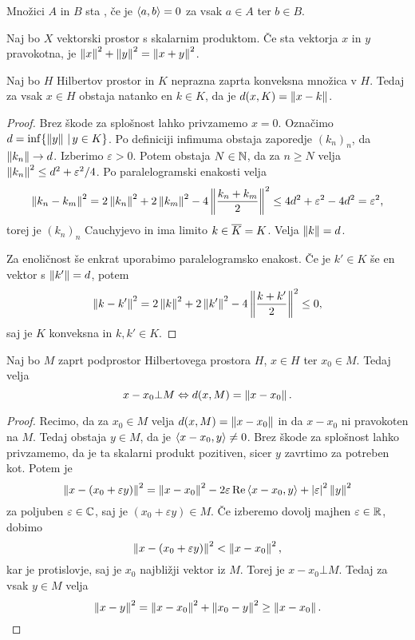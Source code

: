\begin{definicija}
  Množici $A$ in $B$ sta , če je $\left< a,b \right> = 0$ za vsak $a \in
  A$ ter $b \in B$.
\end{definicija}

\begin{izrek}[Pitagora]
  Naj bo $X$ vektorski prostor s skalarnim produktom.
  Če sta vektorja $x$ in $y$ pravokotna, je $\left\lVert x\right\rVert^2 + \left\lVert y\right\rVert^2 =
  \left\lVert x+y\right\rVert^2$.
\end{izrek}

\begin{izrek}
  Naj bo $H$ Hilbertov prostor in $K$ neprazna zaprta konveksna množica v $H$.
  Tedaj za vsak $x \in H$ obstaja natanko en $k \in K$, da je $d(x,K) =
  \left\lVert x-k\right\rVert$.
\end{izrek}

\begin{proof}
  Brez škode za splošnost lahko privzamemo $x = 0$.
  Označimo $d = \inf \{\left\lVert y\right\rVert \,|\, y \in K\}$.
  Po definiciji infimuma obstaja zaporedje $(k_n)_n$, da $\left\lVert k_n\right\rVert \to d$.
  Izberimo $\varepsilon > 0$.
  Potem obstaja $N \in \mathbb{N}$, da za $n \ge N$ velja $\left\lVert k_n\right\rVert^2 \le d^2 +
  \varepsilon^2 /4$.
  Po paralelogramski enakosti velja
  \[
	\left\lVert k_n - k_m\right\rVert^2 = 2 \left\lVert k_n\right\rVert^2 + 2 \left\lVert k_m\right\rVert^2 - 4 \left\lVert\frac{k_n +
		k_m}{2}\right\rVert^2
	\le 4 d^2 + \varepsilon^2 - 4 d^2 = \varepsilon^2,
  \]
  torej je $(k_n)_n$ Cauchyjevo in ima limito $k \in \overline{K} = K$.
  Velja $\left\lVert k\right\rVert = d$.

  Za enoličnost še enkrat uporabimo paralelogramsko enakost.
  Če je $k' \in K$ še en vektor s $\left\lVert k'\right\rVert = d$, potem
  \[
	\left\lVert k-k'\right\rVert^2 = 2 \left\lVert k\right\rVert^2 + 2 \left\lVert k'\right\rVert^2 - 4 \left\lVert\frac{k+k'}{2}\right\rVert^2 \le 0,
  \]
  saj je $K$ konveksna in $k, k' \in K$.
\end{proof}


\begin{izrek}
  Naj bo $M$ zaprt podprostor Hilbertovega prostora $H$, $x \in H$ ter $x_0 \in
  M$.
  Tedaj velja
  \[
	x - x_0 \bot M \Leftrightarrow d(x,M) = \left\lVert x-x_0\right\rVert.
  \]
\end{izrek}

\begin{proof}
  Recimo, da za $x_0 \in M$ velja $d(x,M) = \left\lVert x-x_0\right\rVert$ in da $x - x_0$ ni
  pravokoten na $M$.
  Tedaj obstaja $y \in M$, da je $\left< x - x_0, y \right> \ne 0$.
  Brez škode za splošnost lahko privzamemo, da je ta skalarni produkt pozitiven,
  sicer $y$ zavrtimo za potreben kot.
  Potem je
  \[
	\left\lVert x - (x_0 + \varepsilon y)\right\rVert^2 = \left\lVert x - x_0\right\rVert^2 -
	2 \varepsilon \operatorname{Re} \left< x - x_0, y \right> + \left| \varepsilon \right|^2 \left\lVert y\right\rVert^2
  \]
  za poljuben $\varepsilon \in \mathbb{C}$, saj je $(x_0 + \varepsilon y) \in M$.
  Če izberemo dovolj majhen $\varepsilon \in \mathbb{R}$, dobimo
  \[
	\left\lVert x - (x_0 + \varepsilon y)\right\rVert^2 < \left\lVert x - x_0\right\rVert^2,
  \]
  kar je protislovje, saj je $x_0$ najbližji vektor iz $M$.
  Torej je $x - x_0 \bot M$.
  Tedaj za vsak $y \in M$ velja
  \[
	\left\lVert x-y\right\rVert^2 = \left\lVert x-x_0\right\rVert^2 + \left\lVert x_0 - y\right\rVert^2 \ge \left\lVert x - x_0\right\rVert.
	\qedhere
  \]
\end{proof}

